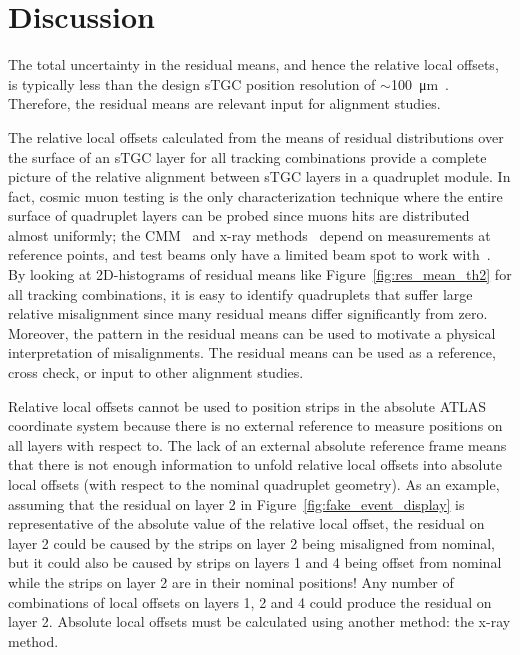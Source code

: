 \section{Discussion}

The total uncertainty in the residual means, and hence the relative local offsets, is typically less than the design sTGC position resolution of $\sim$\SI{100}{\micro\meter}~\cite{nsw_tdr}. Therefore, the residual means are relevant input for alignment studies.

The relative local offsets calculated from the means of residual distributions over the surface of an sTGC layer for all tracking combinations provide a complete picture of the relative alignment between sTGC layers in a quadruplet module. In fact, cosmic muon testing is the only characterization technique where the entire surface of quadruplet layers can be probed since muons hits are distributed almost uniformly; the CMM~\cite{carlson_results_2019} and x-ray methods~\cite{lefebvre_precision_2020} depend on measurements at reference points, and test beams only have a limited beam spot to work with~\cite{abusleme_performance_2016}. By looking at 2D-histograms of residual means like Figure~\ref{fig:res_mean_th2} for all tracking combinations, it is easy to identify quadruplets that suffer large relative misalignment since many residual means differ significantly from zero. Moreover, the pattern in the residual means can be used to motivate a physical interpretation of misalignments. The residual means can be used as a reference, cross check, or input to other alignment studies.

Relative local offsets cannot be used to position strips in the absolute ATLAS coordinate system because there is no external reference to measure positions on all layers with respect to. The lack of an external absolute reference frame means that there is not enough information to unfold relative local offsets into absolute local offsets (with respect to the nominal quadruplet geometry). As an example, assuming that the residual on layer 2 in Figure~\ref{fig:fake_event_display} is representative of the absolute value of the relative local offset, the residual on layer 2 could be caused by the strips on layer 2 being misaligned from nominal, but it could also be caused by strips on layers 1 and 4 being offset from nominal while the strips on layer 2 are in their nominal positions! Any number of combinations of local offsets on layers 1, 2 and 4 could produce the residual on layer 2. Absolute local offsets must be calculated using another method: the x-ray method.

